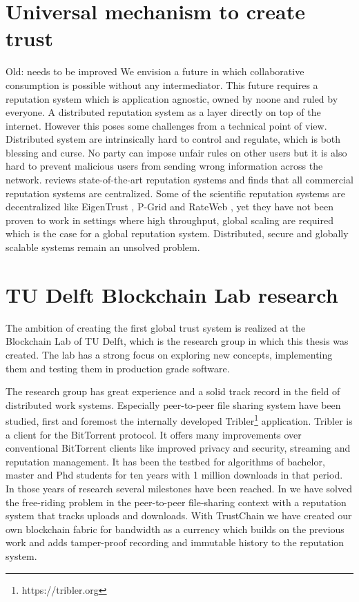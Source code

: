 \section{Universal mechanism to create trust}
{\color{red} Old: needs to be improved}
We envision a future in which collaborative consumption is possible without any intermediator. This
future requires a reputation system which is application agnostic, owned by noone and ruled by 
everyone. A distributed reputation system as a layer directly
on top of the internet. However this poses some challenges from a technical
point of view. Distributed system are intrinsically hard to control and regulate, which is both 
blessing and curse. No party can impose unfair rules on other users but it is also hard to prevent 
malicious users from sending wrong information across the network. \cite{HENDRIKX2015184} reviews
state-of-the-art reputation systems and finds that all commercial reputation systems are centralized.
Some of the scientific reputation systems are decentralized like EigenTrust 
\cite{kamvar2003eigentrust}, P-Grid \cite{aberer2003p} and RateWeb \cite{malik2009rateweb}, yet
they have not been proven to work in settings where high throughput, global scaling are required 
which is the case for a global reputation system. Distributed, secure and globally scalable systems
remain an unsolved problem.


\section{TU Delft Blockchain Lab research}
The ambition of creating the first global trust system is realized at the Blockchain Lab of TU Delft,
which is the research group in which this thesis was created. The lab has a strong focus on exploring
new concepts, implementing them and testing them in production grade software. 

The research group has great experience and a solid track record in the field of distributed work 
systems. Especially peer-to-peer file sharing system have been studied, first and foremost the 
internally developed Tribler\footnote{https://tribler.org} application. Tribler is a client for the
BitTorrent protocol. It offers many improvements over conventional BitTorrent clients like improved
privacy and security, streaming and reputation management. It has been the testbed for algorithms of
bachelor, master and Phd students for ten years with 1 million downloads in that period. In those 
years of research several milestones have been reached. In \cite{meulpolder2009bartercast} we have 
solved the free-riding problem in the peer-to-peer file-sharing context with a reputation system 
that tracks uploads and downloads. With TrustChain \cite{OTTE2017} we have created our own 
blockchain fabric for bandwidth as a currency which builds on the previous work and adds 
tamper-proof recording and immutable history to the reputation system.

